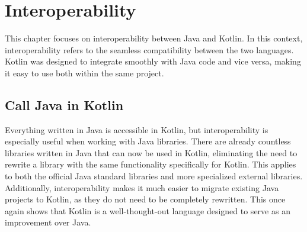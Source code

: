 \documentclass[a4paper, 11pt]{article}
\begin{document}
\section{Interoperability}
  This chapter focuses on interoperability between Java and Kotlin. In this context, interoperability refers to the seamless compatibility between the two languages. Kotlin was designed to integrate smoothly with Java code and vice versa, making it easy to use both within the same project.

\subsection{Call Java in Kotlin}
  Everything written in Java is accessible in Kotlin, but interoperability is especially useful when working with Java libraries. There are already countless libraries written in Java that can now be used in Kotlin, eliminating the need to rewrite a library with the same functionality specifically for Kotlin. This applies to both the official Java standard libraries and more specialized external libraries. Additionally, interoperability makes it much easier to migrate existing Java projects to Kotlin, as they do not need to be completely rewritten. This once again shows that Kotlin is a well-thought-out language designed to serve as an improvement over Java.
\end{document}
